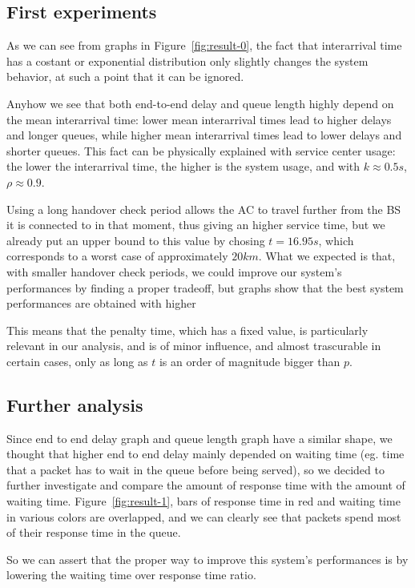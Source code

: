 \documentclass[a4paper,12pt]{article}
\begin{document}
\subsection{First experiments}
As we can see from graphs in Figure~\ref{fig:result-0}, the fact that interarrival time has a costant or exponential distribution only slightly changes the system behavior, at such a point that it can be ignored.

Anyhow we see that both end-to-end delay and queue length highly depend on the mean interarrival time: lower mean interarrival times lead to higher delays and longer queues, while higher mean interarrival times lead to lower delays and shorter queues.
This fact can be physically explained with service center usage: the lower the interarrival time, the higher is the system usage, and with $k \approx 0.5s$, $\rho \approx 0.9$.

Using a long handover check period allows the AC to travel further from the BS it is connected to in that moment, thus giving an higher service time, but we already put an upper bound to this value by chosing $t = 16.95s$, which corresponds to a worst case of approximately $20 km$.
What we expected is that, with smaller handover check periods, we could improve our system's performances by finding a proper tradeoff, but graphs show that the best system performances are obtained with higher

This means that the penalty time, which has a fixed value, is particularly relevant in our analysis, and is of minor influence, and almost trascurable in certain cases, only as long as $t$ is an order of magnitude bigger than $p$.

\subsection{Further analysis}
Since end to end delay graph and queue length graph have a similar shape, we thought that higher end to end delay mainly depended on waiting time (eg. time that a packet has to wait in the queue before being served), so we decided to further investigate and compare the amount of response time with the amount of waiting time.
Figure~\ref{fig:result-1}, bars of response time in red and waiting time in various colors are overlapped, and we can clearly see that packets spend most of their response time in the queue. 

So we can assert that the proper way to improve this system's performances is by lowering the waiting time over response time ratio.
\end{document}

